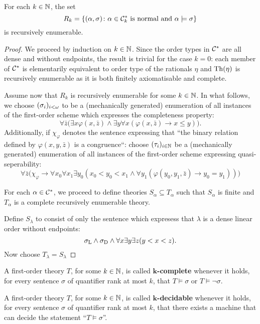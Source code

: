 \begin{lem}
	For each $k\in\mathbb{N}$, the set
	\begin{equation}
		R_k=\left\lbrace (\alpha,\sigma)\colon \alpha\in\mathcal{C}^\ast_k\text{ is normal and }\alpha\models\sigma \right\rbrace
	\end{equation}
	is recursively enumerable.
\end{lem}
\begin{proof}
	We proceed by induction on $k\in\mathbb{N}$.  Since the order types in $\mathcal{C}^\ast$ are all dense and without endpoints, the result is trivial for the case $k=0$: each member of $\mathcal{C}^\ast$ is elementarily equivalent to order type of the rationals $\eta$ and $\operatorname{Th}(\eta)$ is recursively enumerable as it is both finitely axiomatisable and complete.

	Assume now that $R_k$ is recursively enumerable for some $k\in\mathbb{N}$.  In what follows, we choose $(\sigma_i)_{i<\omega}$ to be a (mechanically generated) enumeration of all instances of the first-order scheme which expresses the completeness property:
	\begin{equation}
		\forall\bar{z}\big(\exists x\varphi(x,\bar{z})\wedge\exists y\forall x(\varphi(x,\bar{z})\rightarrow x\leq y)\big).
	\end{equation}
	Additionally, if $\chi_\varphi$ denotes the sentence expressing that ``the binary relation defined by $\varphi(x,y,\bar{z})$ is a congruence``: choose $(\tau_i)_{i\in\mathbb{N}}$ be a (mechanically generated) enumeration of all instances of the first-order scheme expressing quasi-seperability:
	\begin{equation}
		\forall\bar{z}\big(\chi_\varphi\rightarrow\forall x_0\forall x_1\exists y_0(x_0<y_0<x_1\wedge\forall y_1(\varphi(y_0,y_1,\bar{z})\rightarrow y_0=y_1))\big)
	\end{equation}

	For each $\alpha\in\mathcal{C}^\ast$, we proceed to define theories $S_\alpha\subseteq T_\alpha$ such that $S_\alpha$ is finite and $T_\alpha$ is a complete recursively enumerable theory.

	Define $S_\lambda$ to consist of only the sentence which expresess that $\lambda$ is a dense linear order without endpoints:
	\begin{equation}
		\sigma_{\mathrm{L}}\wedge\sigma_{\mathrm{D}}\wedge\forall x\exists y\exists z(y<x<z).
	\end{equation}
	Now choose $T_\lambda=S_\lambda$
\end{proof}

\begin{dfn}
	A first-order theory $T$, for some $k\in\mathbb{N}$, is called $\bm{k}$\textbf{-complete} whenever it holds, for every sentence $\sigma$ of quantifier rank at most $k$, that $T\models\sigma$ or $T\models\neg\sigma$.
\end{dfn}

\begin{dfn}[$k$-Decidability]
	A first-order theory $T$, for some $k\in\mathbb{N}$, is called $\bm{k}$\textbf{-decidable} whenever it holds, for every sentence $\sigma$ of quantifier rank at most $k$, that there exists a machine that can decide the statement ``$T\models\sigma$''.
\end{dfn}
